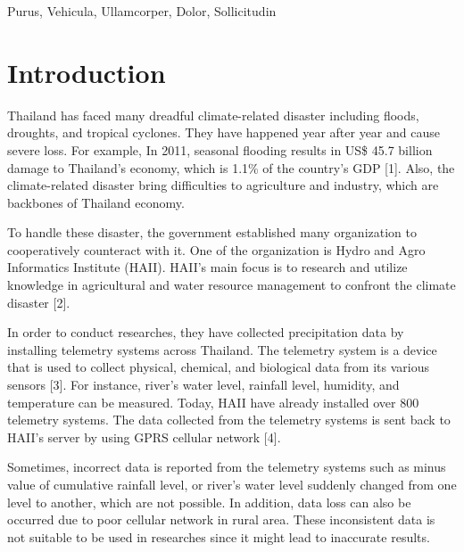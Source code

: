 \documentclass[conference]{IEEEtran}
\begin{document}
\begin{IEEEkeywords}
Purus, Vehicula, Ullamcorper, Dolor, Sollicitudin
\end{IEEEkeywords}

\IEEEpeerreviewmaketitle

\section{Introduction}

Thailand has faced many dreadful climate-related disaster including floods, droughts, and tropical cyclones. They have happened year after year and cause severe loss. For example, In 2011, seasonal flooding results in US\$ 45.7 billion damage to Thailand’s economy, which is 1.1\% of the country’s GDP [1]. Also, the climate-related disaster bring difficulties to agriculture and industry, which are backbones of Thailand economy.

To handle these disaster, the government established many organization to cooperatively counteract with it. One of the organization is Hydro and Agro Informatics Institute (HAII). HAII’s main focus is to research and utilize knowledge in agricultural and water resource management to confront the climate disaster [2].

In order to conduct researches, they have collected precipitation data by installing telemetry systems across Thailand. The telemetry system is a device that is used to collect physical, chemical, and biological data from its various sensors [3]. For instance, river’s water level, rainfall level, humidity, and temperature can be measured. Today, HAII have already installed over 800 telemetry systems. The data collected from the telemetry systems is sent back to HAII’s server by using GPRS cellular network [4].

Sometimes, incorrect data is reported from the telemetry systems such as minus value of cumulative rainfall level, or river’s water level suddenly changed from one level to another, which are not possible. In addition, data loss can also be occurred due to poor cellular network in rural area. These inconsistent data is not suitable to be used in researches since it might lead to inaccurate results.
\end{document}
